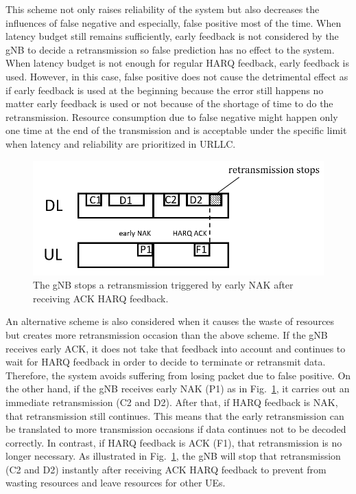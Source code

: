 \documentclass[conference]{IEEEtran}
\begin{document}
This scheme not only raises reliability of the system but also decreases the influences of false negative and especially, false positive most of the time. When latency budget still remains sufficiently, early feedback is not considered by the gNB to decide a retransmission so false prediction has no effect to the system. When latency budget is not enough for regular HARQ feedback, early feedback is used. However, in this case, false positive does not cause the detrimental effect as if early feedback is used at the beginning because the error still happens no matter early feedback is used or not because of the shortage of time to do the retransmission. Resource consumption due to false negative might happen only one time at the end of the transmission and is acceptable under the specific limit when latency and reliability are prioritized in URLLC.

\begin{figure}[htbp]
\centerline{\includegraphics[scale=0.45]{fig5.png}}
\caption{The gNB stops a retransmission triggered by early NAK after receiving ACK HARQ feedback.}
\label{fig5}
\end{figure}

An alternative scheme is also considered when it causes the waste of resources but creates more retransmission occasion than the above scheme. If the gNB receives early ACK, it does not take that feedback into account and continues to wait for HARQ feedback in order to decide to terminate or retransmit data. Therefore, the system avoids suffering from losing packet due to false positive. On the other hand, if the gNB receives early NAK (P1) as in Fig.~\ref{fig5}, it carries out an immediate retransmission (C2 and D2). After that, if HARQ feedback is NAK, that retransmission still continues. This means that the early retransmission can be translated to more transmission occasions if data continues not to be decoded correctly. In contrast, if HARQ feedback is ACK (F1), that retransmission is no longer necessary. As illustrated in Fig.~\ref{fig5}, the gNB will stop that retransmission (C2 and D2) instantly after receiving ACK HARQ feedback to prevent from wasting resources and leave resources for other UEs. 
\end{document}
